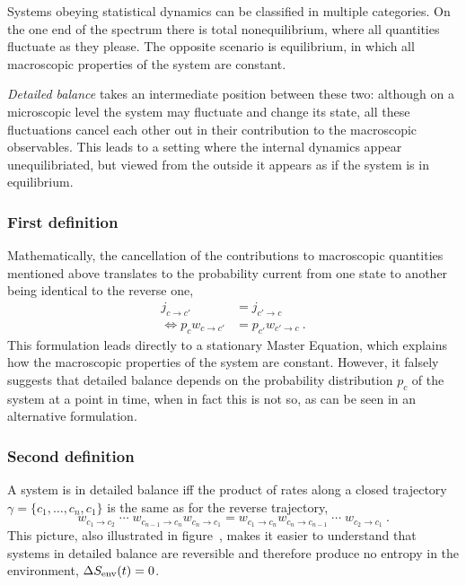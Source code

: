 Systems obeying statistical dynamics can be classified in multiple categories. On the one end of the spectrum there is total nonequilibrium, where all quantities fluctuate as they please. The opposite scenario is equilibrium, in which all macroscopic properties of the system are constant.

\emph{Detailed balance} takes an intermediate position between these two: although on a microscopic level the system may fluctuate and change its state, all these fluctuations cancel each other out in their contribution to the macroscopic observables. This leads to a setting where the internal dynamics appear unequilibriated, but viewed from the outside it appears as if the system is in equilibrium.



\subsubsection{First definition}


Mathematically, the cancellation of the contributions to macroscopic quantities mentioned above translates to the probability current from one state to another being identical to the reverse one,
%
\begin{equation}\begin{split}
	\label{eqn:db first def}
	j_{c\to c'} &= j_{c'\to c} \\
	\Leftrightarrow p_cw_{c\to c'} &= p_{c'}w_{c'\to c} ~.
\end{split}\end{equation}
%
This formulation leads directly to a stationary Master Equation, which explains how the macroscopic properties of the system are constant. However, it falsely suggests that detailed balance depends on the probability distribution \(p_c\) of the system at a point in time, when in fact this is not so, as can be seen in an alternative formulation.


\subsubsection{Second definition}

A system is in detailed balance iff the product of rates along a closed trajectory \(\gamma = \{c_1,\ldots,c_n,c_1\}\) is the same as for the reverse trajectory,
%
\begin{equation}
	w_{c_1\to c_2} \; \cdots \; w_{c_{n-1}\to c_n}w_{c_n\to c_1}
	=
	w_{c_1\to c_n}w_{c_n\to c_{n-1}} \; \cdots \; w_{c_2\to c_1} ~.
\end{equation}
%
This picture, also illustrated in figure~, makes it easier to understand that systems in detailed balance are reversible and therefore produce no entropy in the environment, \(\Delta S_\text{env}(t)=0\).

